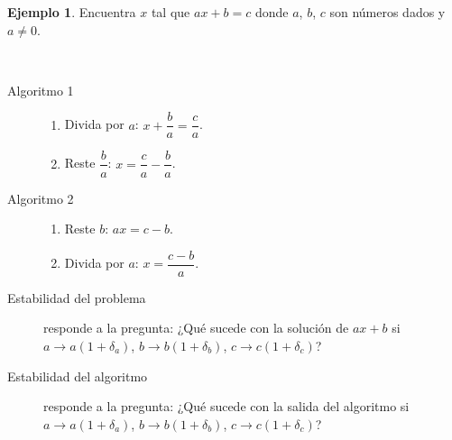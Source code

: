 \documentclass[a4paper,10pt]{scrartcl}
\theoremstyle{definition}
\newtheorem{example}{Ejemplo}
\begin{document}
\begin{example}
    Encuentra $x$ tal que $ax+b=c$ donde $a$, $b$, $c$ son números
    dados y $a\neq 0$.

    \

    \begin{minipage}{0.4\paperwidth}
        \begin{description}
            \item[Algoritmo 1]\leavevmode
                  \begin{enumerate}
                      \item

                            Divida por $a$: $x+\dfrac{b}{a}=\dfrac{c}{a}$.

                      \item

                            Reste $\dfrac{b}{a}$: $x=\dfrac{c}{a}-\dfrac{b}{a}$.
                  \end{enumerate}
        \end{description}
    \end{minipage}
    \hfill
    \begin{minipage}{0.4\paperwidth}
        \begin{description}

            \item[Algoritmo 2]\leavevmode

                  \begin{enumerate}
                      \item

                            Reste $b$: $ax=c-b$.

                      \item

                            Divida por $a$: $x=\dfrac{c-b}{a}$.
                  \end{enumerate}
        \end{description}
    \end{minipage}
\end{example}

\begin{description}
    \item[Estabilidad del problema] responde a la pregunta:
          ¿Qué sucede con la solución de $ax+b$ si $a\to a\left(1+\delta_{a}\right)$,
          $b\to b\left(1+\delta_{b}\right)$, $c\to c\left(1+\delta_{c}\right)$?

    \item[Estabilidad del algoritmo] responde a la pregunta:
          ¿Qué sucede con la salida del algoritmo si $a\to a\left(1+\delta_{a}\right)$,
          $b\to b\left(1+\delta_{b}\right)$, $c\to c\left(1+\delta_{c}\right)$?
\end{description}
\end{document}
